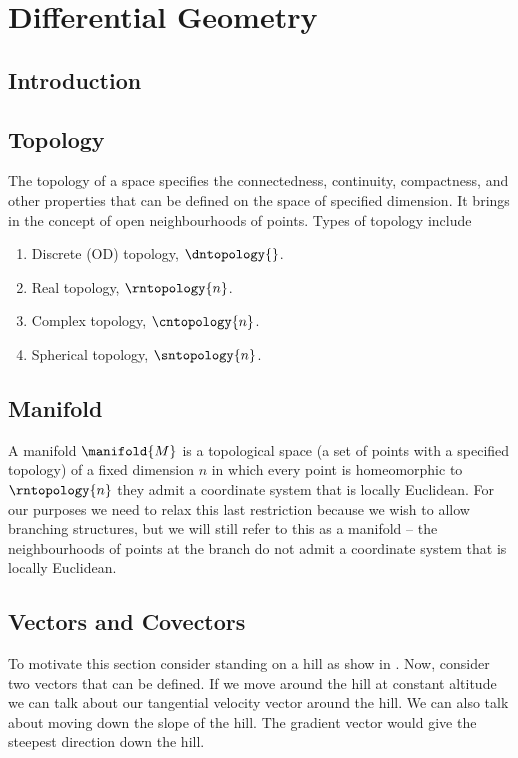 \chapter{Differential Geometry}
\label{cha:differentialgeometry}

\section{Introduction}

\section{Topology}

The topology of a space specifies the connectedness, continuity, compactness,
and other properties that can be defined on the space of specified
dimension. It brings in the concept of open neighbourhoods of points. Types of
topology include

\begin{enumerate}
\item Discrete (OD) topology, $\dntopology{}$.
\item Real topology, $\rntopology{n}$.
\item Complex topology, $\cntopology{n}$.
\item Spherical topology, $\sntopology{n}$.
\end{enumerate}

\section{Manifold}

A manifold $\manifold{M}$ is a topological space (\ie a set of points
with a specified topology) of a fixed dimension $n$ in which every
point is homeomorphic to $\rntopology{n}$ \ie they admit a coordinate
system that is locally Euclidean. For our purposes we need to relax
this last restriction because we wish to allow branching structures,
but we will still refer to this as a manifold – the neighbourhoods of
points at the branch do not admit a coordinate system that is locally
Euclidean.

\section{Vectors and Covectors}

To motivate this section consider standing on a hill as show in
. Now, consider two vectors that can be
defined. If we move around the hill at constant altitude we can talk
about our tangential velocity vector around the hill. We can also talk
about moving down the slope of the hill. The gradient vector would
give the steepest direction down the hill.

